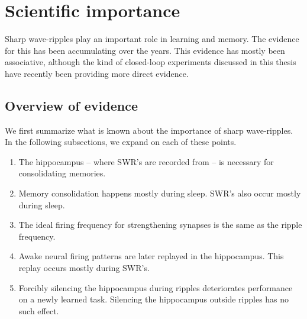 \section{Scientific importance}
\label{sec:science}

Sharp wave-ripples play an important role in learning and memory.\footnotemark{} The evidence for this has been accumulating over the years. This evidence has mostly been associative, although the kind of closed-loop experiments discussed in this thesis have recently been providing more direct evidence.





\subsection{Overview of evidence}

We first summarize what is known about the importance of sharp wave-ripples.
In the following subsections, we expand on each of these points.

\begin{enumerate}
\item The hippocampus -- where SWR's are recorded from -- is necessary for consolidating memories.
\item Memory consolidation happens mostly during sleep. SWR's also occur mostly during sleep.
\item The ideal firing frequency for strengthening synapses is the same as the ripple frequency.
\item Awake neural firing patterns are later replayed in the hippocampus. This replay occurs mostly during SWR's.
\item Forcibly silencing the hippocampus during ripples deteriorates performance on a newly learned task. Silencing the hippocampus outside ripples has no such effect.
\end{enumerate}





